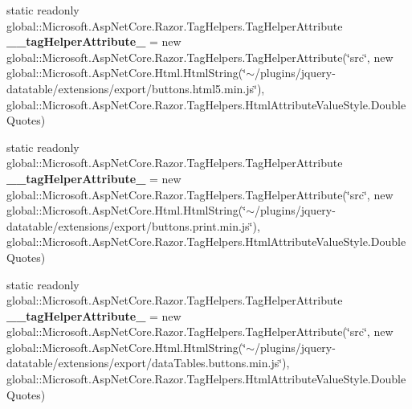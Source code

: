 \begin{DoxyCompactItemize}
\item 
\mbox{\label{class_asp_net_core_1_1_views___account_movements___index_a58cd87fa8dc928ba0de1241316401a9c}} 
static readonly global\+::\+Microsoft.\+Asp\+Net\+Core.\+Razor.\+Tag\+Helpers.\+Tag\+Helper\+Attribute {\bfseries \+\_\+\+\_\+tag\+Helper\+Attribute\+\_} = new global\+::\+Microsoft.\+Asp\+Net\+Core.\+Razor.\+Tag\+Helpers.\+Tag\+Helper\+Attribute(\char`\"{}src\char`\"{}, new global\+::\+Microsoft.\+Asp\+Net\+Core.\+Html.\+Html\+String(\char`\"{}$\sim$/plugins/jquery-\/datatable/extensions/export/buttons.\+html5.\+min.\+js\char`\"{}), global\+::\+Microsoft.\+Asp\+Net\+Core.\+Razor.\+Tag\+Helpers.\+Html\+Attribute\+Value\+Style.\+Double\+Quotes)
\item 
\mbox{\label{class_asp_net_core_1_1_views___account_movements___index_a8f2955d488b7e2e5fab783c91d5ccdf2}} 
static readonly global\+::\+Microsoft.\+Asp\+Net\+Core.\+Razor.\+Tag\+Helpers.\+Tag\+Helper\+Attribute {\bfseries \+\_\+\+\_\+tag\+Helper\+Attribute\+\_} = new global\+::\+Microsoft.\+Asp\+Net\+Core.\+Razor.\+Tag\+Helpers.\+Tag\+Helper\+Attribute(\char`\"{}src\char`\"{}, new global\+::\+Microsoft.\+Asp\+Net\+Core.\+Html.\+Html\+String(\char`\"{}$\sim$/plugins/jquery-\/datatable/extensions/export/buttons.\+print.\+min.\+js\char`\"{}), global\+::\+Microsoft.\+Asp\+Net\+Core.\+Razor.\+Tag\+Helpers.\+Html\+Attribute\+Value\+Style.\+Double\+Quotes)
\item 
\mbox{\label{class_asp_net_core_1_1_views___account_movements___index_a05c9a0a3c593b43a1f158e0f30a4db47}} 
static readonly global\+::\+Microsoft.\+Asp\+Net\+Core.\+Razor.\+Tag\+Helpers.\+Tag\+Helper\+Attribute {\bfseries \+\_\+\+\_\+tag\+Helper\+Attribute\+\_} = new global\+::\+Microsoft.\+Asp\+Net\+Core.\+Razor.\+Tag\+Helpers.\+Tag\+Helper\+Attribute(\char`\"{}src\char`\"{}, new global\+::\+Microsoft.\+Asp\+Net\+Core.\+Html.\+Html\+String(\char`\"{}$\sim$/plugins/jquery-\/datatable/extensions/export/data\+Tables.\+buttons.\+min.\+js\char`\"{}), global\+::\+Microsoft.\+Asp\+Net\+Core.\+Razor.\+Tag\+Helpers.\+Html\+Attribute\+Value\+Style.\+Double\+Quotes)
\item 
\mbox{\label{class_asp_net_core_1_1_views___account_movements___index_a7a8b0f0f591dbdb85ef58bfbd0e758c0}} 

\end{DoxyCompactItemize}
